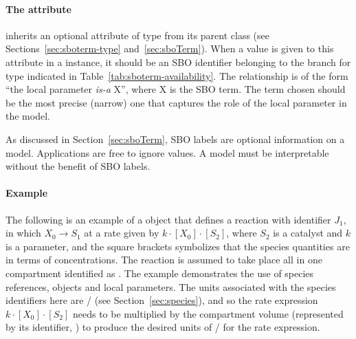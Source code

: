 \paragraph{The  attribute}

\LocalParameter inherits an optional  attribute of
type  from its parent class \SBase (see
Sections~\ref{sec:sboterm-type} and~\ref{sec:sboTerm}).  When a
value is given to this attribute in a \LocalParameter instance, it
should be an SBO identifier belonging to the branch for type
\LocalParameter indicated in Table~\ref{tab:sboterm-availability}.
The relationship is of the form ``the local parameter \emph{is-a}
X'', where X is the SBO term.  The term chosen should be the most
precise (narrow) one that captures the role of the local parameter
in the model.

As discussed in Section~\ref{sec:sboTerm}, SBO labels are optional
information on a model.  Applications are free to ignore
 values.  A model must be interpretable without the
benefit of SBO labels.


\paragraph{Example}

The following is an example of a \Reaction object that defines a
reaction with identifier $J_1$, in which $X_0 \rightarrow S_1$ at
a rate given by $k \cdot [X_0] \cdot [S_2]$, where $S_2$ is a
catalyst and $k$ is a parameter, and the square brackets
symbolizes that the species quantities are in terms of
concentrations.  The reaction is assumed to take place all in one
compartment identified as .  The example demonstrates the
use of species references, \KineticLaw objects and local
parameters.  The units associated with the species identifiers
here are / (see
Section~\ref{sec:species}), and so the rate expression $k \cdot
[X_0] \cdot [S_2]$ needs to be multiplied by the compartment
volume (represented by its identifier, ) to produce the
desired units of / for the rate
expression.


